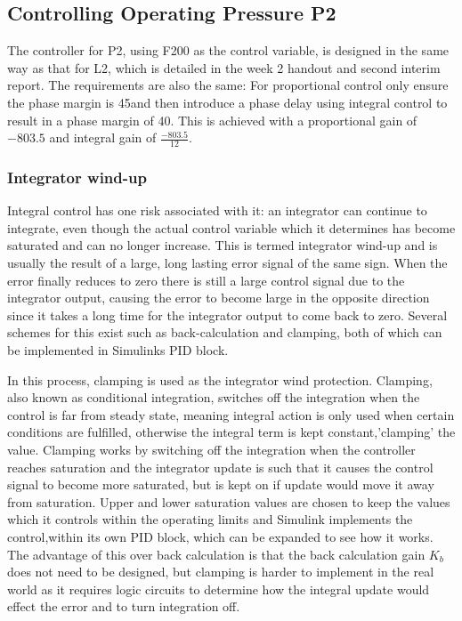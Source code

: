\documentclass[11pt]{article}
\begin{document}
\subsection{Controlling Operating Pressure P2}
The controller for P2, using F200 as the control variable, is designed in the same way as that for L2, which is detailed in the week 2 handout and second interim report. The requirements are also the same: For proportional control only ensure the phase margin is 45\degree and then introduce a phase delay using integral control to result in a phase margin of 40\degree. This is achieved with a proportional gain of $-803.5$ and integral gain of $\frac{-803.5}{12}$.

\subsubsection{Integrator wind-up}
Integral control has one risk associated with it: an integrator can continue to integrate, even though the actual control variable which it determines has become saturated and can no longer increase. This is termed integrator wind-up and is usually the result of a large, long lasting error signal of the same sign. When the error finally reduces to zero there is still a large control signal due to the integrator output, causing the error to become large in the opposite direction since it takes a long time for the integrator output to come back to zero. Several schemes for this exist such as back-calculation and clamping, both of which can be implemented in Simulinks PID block.

In this process, clamping is used as the integrator wind  protection. Clamping, also known as conditional integration, switches off the integration when the control is far from steady state, meaning integral action is only used when certain conditions are fulfilled, otherwise the integral term is kept constant,'clamping' the value. Clamping works by switching off the integration when the controller reaches saturation and the integrator update is such that it causes the control signal to become more saturated, but is kept on if update would move it away from saturation. Upper and lower saturation values are chosen to keep the values which it controls within the operating limits and Simulink implements the control,within its own PID block, which can be expanded to see how it works. The advantage of this over back calculation is that the back calculation gain $K_b$ does not need to be designed, but clamping is harder to implement in the real world as it requires logic circuits to determine how the integral update would effect the error and to turn integration off. 
\end{document}
